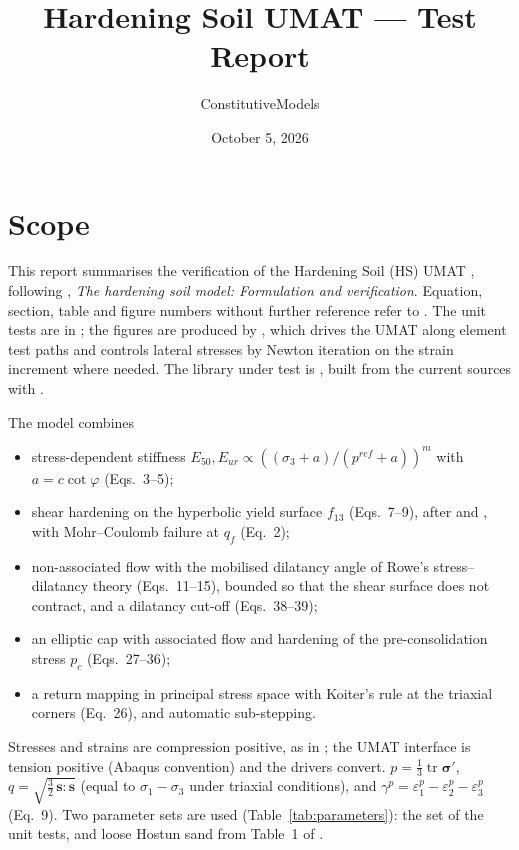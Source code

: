 \documentclass[11pt,a4paper]{article}
\title{Hardening Soil UMAT --- Test Report}
\author{ConstitutiveModels}
\date{October 5, 2026}
\newcommand{\eref}{^{\mathit{ref}}}
\begin{document}
\maketitle

\section{Scope}

This report summarises the verification of the Hardening Soil (HS) UMAT
, following \citet{Schanz_1999}, \emph{The
hardening soil model: Formulation and verification}. Equation, section, table and figure numbers
without further reference refer to \citet{Schanz_1999}. The unit tests are in ; the figures are produced by
, which drives the UMAT along element test paths and
controls lateral stresses by Newton iteration on the strain increment where needed. The library
under test is , built from the current sources with
.

The model combines
\begin{itemize}
  \item stress-dependent stiffness $E_{50}, E_{ur} \propto \left((\sigma_3 + a)/(p\eref + a)\right)^m$
        with $a = c\cot\varphi$ (Eqs.~3--5);
  \item shear hardening on the hyperbolic yield surface $f_{13}$ (Eqs.~7--9), after
        \citet{Kondner_1963} and \citet{Duncan_1970}, with Mohr--Coulomb failure at $q_f$ (Eq.~2);
  \item non-associated flow with the mobilised dilatancy angle of Rowe's stress--dilatancy theory
        \citep{Rowe_1962, Schanz_1996} (Eqs.~11--15), bounded so that the shear
        surface does not contract, and a dilatancy cut-off (Eqs.~38--39);
  \item an elliptic cap with associated flow and hardening of the pre-consolidation stress $p_c$
        (Eqs.~27--36);
  \item a return mapping in principal stress space with Koiter's rule at the triaxial corners
        \citep{Koiter_1960} (Eq.~26), and automatic sub-stepping.
\end{itemize}

Stresses and strains are compression positive, as in \citet{Schanz_1999}; the UMAT interface is tension
positive (Abaqus convention) and the drivers convert. $p = \frac{1}{3}\operatorname{tr}\boldsymbol{\sigma}'$,
$q = \sqrt{\frac{3}{2}\,\mathbf{s}:\mathbf{s}}$ (equal to $\sigma_1 - \sigma_3$ under triaxial
conditions), and $\gamma^p = \varepsilon_1^p - \varepsilon_2^p - \varepsilon_3^p$ (Eq.~9). Two
parameter sets are used (Table~\ref{tab:parameters}): the set of the unit tests, and loose Hostun
sand from Table~1 of \citet{Schanz_1999}.
\end{document}
